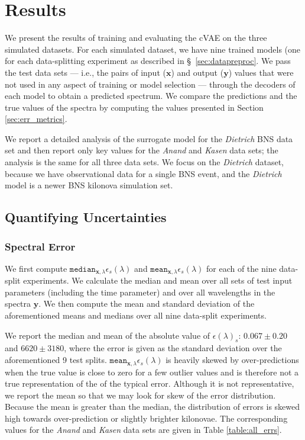 \documentclass[fleqn,usenatbib,useAMS]{mnras}
\begin{document}
\section{Results}
\label{sec:results}
We present the results of training and evaluating the cVAE on the three simulated datasets. 
For each simulated dataset, we have nine trained models (one for each data-splitting experiment as described in \S~\ref{sec:datapreproc}.
We pass the test data sets --- i.e., the pairs of input ($\mathbf{x}$) and output ($\mathbf{y}$) values that were not used in any aspect of training or model selection --- through the decoders of each model to obtain a predicted spectrum. 
We compare the predictions and the true values of the spectra by computing the values presented in Section \ref{sec:err_metrics}. 

We report a detailed analysis of the surrogate model for the \emph{Dietrich} BNS data set and then report only key values for the \emph{Anand} and \emph{Kasen} data sets; the analysis is the same for all three data sets.
We focus on the \emph{Dietrich} dataset, because we have observational data for a single BNS event, and the \emph{Dietrich} model is a newer BNS kilonova simulation set.


\subsection{Quantifying Uncertainties}

\subsubsection{Spectral Error}
\label{sec:spec_err}

We first compute $\texttt{median}_{\mathbf{x}, \lambda}\epsilon_s(\lambda)$  and $\texttt{mean}_{\mathbf{x}, \lambda}\epsilon_s(\lambda)$ for each of the nine data-split experiments.
We calculate the median and mean over all sets of test input parameters (including the time parameter) and over all wavelengths in the spectra $\mathbf{y}$.
We then compute the mean and standard deviation of the aforementioned means and medians over all nine data-split experiments.

We report the median and mean of the absolute value of $\epsilon(\lambda)_{s}$: $0.067 \pm 0.20$ and $6620 \pm 3180$, where the error is given as the standard deviation over the aforementioned 9 test splits. 
$\texttt{mean}_{\mathbf{x}, \lambda}\epsilon_s(\lambda)$ is heavily skewed by over-predictions when the true value is close to zero for a few outlier values and is therefore not a true representation of the of the typical error.
Although it is not representative, we report the mean so that we may look for skew of the error distribution.
Because the mean is greater than the median, the distribution of errors is skewed high towards over-prediction or slightly brighter kilonovae. 
The corresponding values for the \emph{Anand} and \emph{Kasen} data sets are given in Table \ref{table:all_errs}. 
\end{document}
